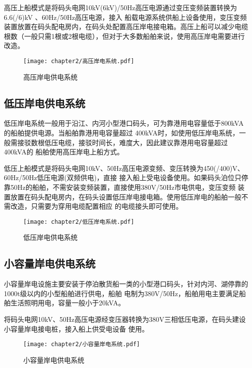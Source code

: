 高压上船模式是将码头电网10kV(6kV)/50Hz高压电源通过变压变频装置转换为6.6(/6)kV 、60Hz/50Hz高压电源，接入
船载电源系统供船上设备使用，变压变频装置放置在码头配电房内，在码头处配置高压岸电接电箱。高压上船可以减少电缆
根数（一般只需1根或2根电缆），但对于大多数船舶来说，使用高压岸电需要进行改造。

\begin{figure}[!htp]
	\centering
	\texttt{[image: chapter2/高压岸电系统.pdf]}
	\caption{高压岸电供电系统}
	\label{fig:高压岸电供电系统}
\end{figure}

\subsection{低压岸电供电系统}

低压岸电系统一般用于沿江、内河小型港口码头，可为靠港用电容量低于800kVA的船舶提供电源。当船舶靠港用电容量超过
400kVA时，如使用低压岸电系统，一般需接驳数根低压电缆，接驳时间长，难度大，因此建议靠港用电容量超过400kVA的
船舶使用高压岸电上船方式。

低压上船模式是将码头电网10kV、50Hz高压电源变频、变压转换为450(/400)V、60Hz/50Hz低压电源(双频供电)，直接
接入船上受电设备使用。如果码头泊位只停靠50Hz的船舶，不需安装变频装置，直接使用380V/50Hz市电供电，变压变频
装置放置在码头配电房内，在码头设置低压岸电接电箱。使用低压岸电的船舶一般不需改造，只需要为穿用电缆配置相应
的电缆接头即可使用。

\begin{figure}[!htp]
	\centering
	\texttt{[image: chapter2/低压岸电系统.pdf]}
	\caption{低压岸电供电系统}
	\label{fig:低压岸电供电系统}
\end{figure}

\subsection{小容量岸电供电系统}

小容量岸电设施主要安装于停泊散货船一类的小型港口码头，针对内河、湖停靠的1000t级以内的小型船舶进行供电，船舶
电制为380V/50Hz，船舶用电主要满足船舶生活照明用电，容量一般小于20kVA。

将码头电网10kV、50Hz高压电源经变压器转换为380V三相低压电源，在码头建设小容量岸电接电桩，接入船上供受电设备
使用。

\begin{figure}[!htp]
	\centering
	\texttt{[image: chapter2/小容量岸电系统.pdf]}
	\caption{小容量岸电供电系统}
	\label{fig:小容量岸电供电系统}
\end{figure}

